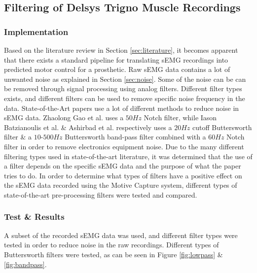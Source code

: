 \documentclass[../main.tex]{subfiles}
\begin{document}
\subsection{Filtering of Delsys Trigno Muscle Recordings}

\subsubsection{Implementation}

Based on the literature review in Section \ref{sec:literature}, it becomes apparent that there exists a standard pipeline for translating \gls{sEMG} recordings into predicted motor control for a prosthetic.
Raw \gls{sEMG} data contains a lot of unwanted noise as explained in Section \ref{sec:noise}.
Some of the noise can be can be removed through signal processing using analog filters.
Different filter types exists, and different filters can be used to remove specific noise frequency in the data. 
State-of-the-Art papers use a lot of different methods to reduce noise in \gls{sEMG} data.
Zhaolong Gao et al. \cite{Zhaolong2021} uses a $50Hz$ Notch filter, while Iason Batzianoulis et al. \cite{Batzianoulis2018} \& Ashirbad et al. \cite{ashirbad2022} respectively uses a $20Hz$ cutoff Buttersworth filter \& a $10$-$500Hz$  Buttersworth band-pass filter combined with a $60Hz$ Notch filter in order to remove electronics equipment noise.
Due to the many different filtering types used in state-of-the-art literature, it was determined that the use of a filter depends on the specific \gls{sEMG} data and the purpose of what the paper tries to do.
In order to determine what types of filters have a positive effect on the \gls{sEMG} data recorded using the Motive Capture system, different types of state-of-the-art pre-processing filters were tested and compared.


\subsubsection{Test \& Results}

A subset of the recorded \gls{sEMG} data was used, and different filter types were tested in order to reduce noise in the raw recordings.
Different types of Buttersworth filters were tested, as can be seen in Figure \ref{fig:lowpass} \& \ref{fig:bandpass}.
\end{document}
